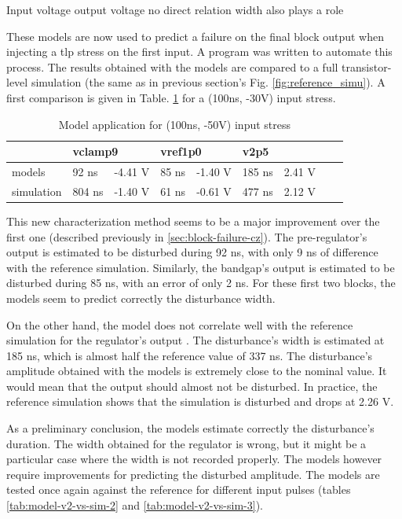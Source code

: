 Input voltage output voltage no direct relation
width also plays a role

These models are now used to predict a failure on the final block output when injecting a \gls{tlp} stress on the first input.
A program was written to automate this process.
The results obtained with the models are compared to a full transistor-level simulation (the same as in previous section's Fig. \ref{fig:reference_simu}).
A first comparison is given in Table. \ref{tab:model-v2-vs-sim} for a (100ns, -30V) input stress.

\begin{table}[!h]
\centering
\begin{tabular}{@{}lllllllll@{}}
           & \multicolumn{2}{l}{vclamp9}          & \multicolumn{2}{l}{vref1p0}          & \multicolumn{2}{l}{v2p5}               \\
\toprule
models     & 92 ns  & -4.41 V                     & 85 ns & -1.40 V                      & 185 ns & 2.41 V \\
simulation & 804 ns & -1.40 V                     & 61 ns & -0.61 V                      & 477 ns      & 2.12 V
\end{tabular}
\caption{Model application for (100ns, -50V) input stress}
\label{tab:model-v2-vs-sim}
\end{table}

This new characterization method seems to be a major improvement over the first one (described previously in \ref{sec:block-failure-cz}).
The pre-regulator's output is estimated to be disturbed during 92 ns, with only 9 ns of difference with the reference simulation.
Similarly, the bandgap's output is estimated to be disturbed during 85 ns, with an error of only 2 ns.
For these first two blocks, the models seem to predict correctly the disturbance width.

On the other hand, the model does not correlate well with the reference simulation for the regulator's output .
The disturbance's width is estimated at 185 ns, which is almost half the reference value of 337 ns.
The disturbance's amplitude obtained with the models is extremely close to the nominal value.
It would mean that the output should almost not be disturbed.
In practice, the reference simulation shows that the simulation is disturbed and drops at 2.26 V.

As a preliminary conclusion, the models estimate correctly the disturbance's duration.
The width obtained for the regulator is wrong, but it might be a particular case where the width is not recorded properly.
The models however require improvements for predicting the disturbed amplitude.
The models are tested once again against the reference for different input pulses (tables \ref{tab:model-v2-vs-sim-2} and \ref{tab:model-v2-vs-sim-3}).

